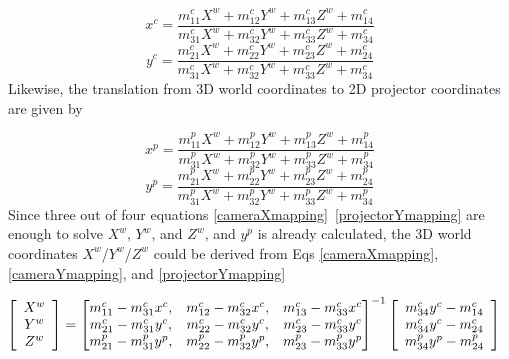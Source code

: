 \begin{equation}
%
x^c %
= \frac%
{m^c_{11}X^w + m^c_{12}Y^w + m^c_{13}Z^w + m^c_{14}}%
{m^c_{31}X^w + m^c_{32}Y^w + m^c_{33}Z^w + m^c_{34}}
%
\label{cameraXmapping}
\end{equation}%
%
%
\begin{equation}
%
y^c %
= \frac%
{m^c_{21}X^w + m^c_{22}Y^w + m^c_{23}Z^w + m^c_{24}}%
{m^c_{31}X^w + m^c_{32}Y^w + m^c_{33}Z^w + m^c_{34}}
%
\label{cameraYmapping}
\end{equation}%
%
%
Likewise, the translation from 3D world coordinates to 2D projector coordinates are given by\par
\begin{equation}
%
x^p %
= \frac%
{m^p_{11}X^w + m^p_{12}Y^w + m^p_{13}Z^w + m^p_{14}}%
{m^p_{31}X^w + m^p_{32}Y^w + m^p_{33}Z^w + m^p_{34}}
%
\label{projectorXmapping}
\end{equation}%
%
\begin{equation}
%
y^p %
= \frac%
{m^p_{21}X^w + m^p_{22}Y^w + m^p_{23}Z^w + m^p_{24}}%
{m^p_{31}X^w + m^p_{32}Y^w + m^p_{33}Z^w + m^p_{34}}
%
\label{projectorYmapping}
\end{equation}%
%
%
Since three out of four equations \ref{cameraXmapping} \texttildelow \,\ref{projectorYmapping} are enough to solve \(X^{w}\),  \(Y^{w}\),  and \(Z^{w}\), and \(y^p\) is already calculated, the 3D world coordinates \(X^{w}\)/\(Y^{w}\)/\(Z^{w}\)  could be derived from Eqs  \ref{cameraXmapping},  \ref{cameraYmapping}, and \ref{projectorYmapping}\par%
%
\begin{equation}
\hspace*{-0.3cm} 
%
\left[ \begin{array}{c} X^w\\ Y^w\\ Z^w\end{array} \right] %
= %
\begin{bmatrix} %
m^c_{11} - m^c_{31}x^c, &m^c_{12} - m^c_{32}x^c, &m^c_{13} - m^c_{33}x^c \\%
m^c_{21} - m^c_{31}y^c, &m^c_{22} - m^c_{32}y^c, &m^c_{23} - m^c_{33}y^c \\%
m^p_{21} - m^p_{31}y^p, &m^p_{22} - m^p_{32}y^p, &m^p_{23} - m^p_{33}y^p %
\end{bmatrix} ^{-1} %
\left[ \begin{array}{c}%
m^c_{34}y^c - m^c_{14}\\%
m^c_{34}y^c - m^c_{24}\\%
m^p_{34}y^p - m^p_{24}%
\end{array} \right]
%
\label{equationInversion}
\end{equation}%
